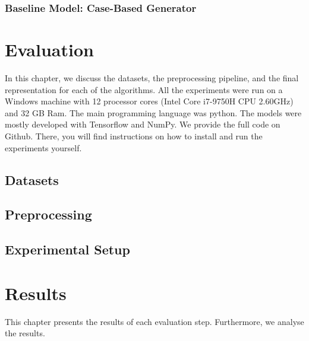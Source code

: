 \documentclass[runningheads]{llncs}
\begin{document}
\subsubsection{Baseline Model: Case-Based Generator}



\section{Evaluation}
\label{ch:evaluation}
In this chapter, we discuss the datasets, the preprocessing pipeline, and the final representation for each of the algorithms. All the experiments were run on a Windows machine with 12 processor cores (Intel Core i7-9750H CPU 2.60GHz) and 32 GB Ram. The main programming language was python. 
The models were mostly developed with Tensorflow\cite{abadi2016tensorflow} and NumPy\cite{2020NumPy-Array}. 
We provide the full code on Github\cite{hundogan_ThesisProjectCode_2022}. 
There, you will find instructions on how to install and run the experiments yourself.


\subsection{Datasets}
\label{sec:dataset_description}




\subsection{Preprocessing}
\label{sec:preprocessing}


\subsection{Experimental Setup}
\label{sec:experimental_setup}







\section{Results}
\label{ch:results}
This chapter presents the results of each evaluation step. Furthermore, we analyse the results.

\end{document}
